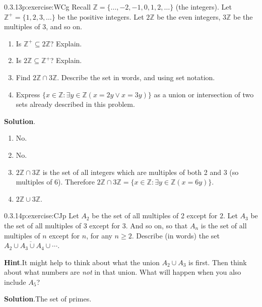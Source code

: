 \documentclass[twoside,11pt,]{book}
\newcommand{\blocktitlefont}{\relax}
\numberwithin{equation}{chapter}
\newcommand{\Z}{\mathbb Z}
\newcommand{\st}{:}
\renewcommand{\bar}{\overline}
\begin{document}
\begin{divisionsolution}{0.3.13}{}{p:exercise:WCg}%
Recall \(\Z = \{\ldots,-2,-1,0, 1,2,\ldots\}\) (the integers). Let \(\Z^+ = \{1, 2, 3, \ldots\}\) be the positive integers. Let \(2\Z\) be the even integers, \(3\Z\) be the multiples of 3, and so on.%
\begin{enumerate}[label=(\alph*)]
\item{}Is \(\Z^+ \subseteq 2\Z\)? Explain.%
\item{}Is \(2\Z \subseteq \Z^+\)? Explain.%
\item{}Find \(2\Z \cap 3\Z\). Describe the set in words, and using set notation.%
\item{}Express \(\{x \in \Z \st \exists y\in \Z (x = 2y \vee x = 3y)\}\) as a union or intersection of two sets already described in this problem.%
\end{enumerate}
%
\par\smallskip%
\noindent\textbf{\blocktitlefont Solution}.\quad{}%
\begin{enumerate}[label=(\alph*)]
\item{}No.%
\item{}No.%
\item{}\(2\Z \cap 3\Z\) is the set of all integers which are multiples of both 2 and 3 (so multiples of 6). Therefore \(2\Z \cap 3\Z = \{x \in \Z \st \exists y\in \Z(x = 6y)\}\).%
\item{}\(2\Z \cup 3\Z\).%
\end{enumerate}
%
\end{divisionsolution}%
\begin{divisionsolution}{0.3.14}{}{p:exercise:CJp}%
Let \(A_2\) be the set of all multiples of 2 except for \(2\). Let \(A_3\) be the set of all multiples of 3 except for 3. And so on, so that \(A_n\) is the set of all multiples of \(n\) except for \(n\), for any \(n \ge 2\). Describe (in words) the set \(\bar{A_2 \cup A_3 \cup A_4 \cup \cdots}\).%
\par\smallskip%
\noindent\textbf{\blocktitlefont Hint}.\quad{}It might help to think about what the union \(A_2 \cup A_3\) is first.  Then think about what numbers are \emph{not} in that union.  What will happen when you also include \(A_5\)?%
\par\smallskip%
\noindent\textbf{\blocktitlefont Solution}.\quad{}The set of primes.%
\end{divisionsolution}%
\end{document}
